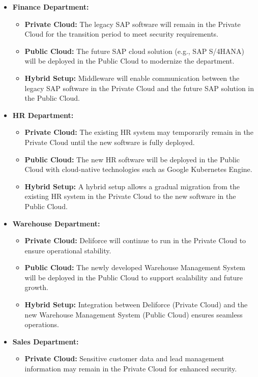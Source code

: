 \begin{itemize}
    \item \textbf{Finance Department:} 
    \begin{itemize}
        \item \textbf{Private Cloud:} The legacy SAP software will remain in the Private Cloud for the transition period to meet security requirements.
        \item \textbf{Public Cloud:} The future SAP cloud solution (e.g., SAP S/4HANA) will be deployed in the Public Cloud to modernize the department.
        \item \textbf{Hybrid Setup:} Middleware will enable communication between the legacy SAP software in the Private Cloud and the future SAP solution in the Public Cloud.
    \end{itemize}
    \item \textbf{HR Department:} 
    \begin{itemize}
        \item \textbf{Private Cloud:} The existing HR system may temporarily remain in the Private Cloud until the new software is fully deployed.
        \item \textbf{Public Cloud:} The new HR software will be deployed in the Public Cloud with cloud-native technologies such as Google Kubernetes Engine.
        \item \textbf{Hybrid Setup:} A hybrid setup allows a gradual migration from the existing HR system in the Private Cloud to the new software in the Public Cloud.
    \end{itemize}
    \item \textbf{Warehouse Department:}
    \begin{itemize}
        \item \textbf{Private Cloud:} Deliforce will continue to run in the Private Cloud to ensure operational stability.
        \item \textbf{Public Cloud:} The newly developed Warehouse Management System will be deployed in the Public Cloud to support scalability and future growth.
        \item \textbf{Hybrid Setup:} Integration between Deliforce (Private Cloud) and the new Warehouse Management System (Public Cloud) ensures seamless operations.
    \end{itemize}
    \item \textbf{Sales Department:}
    \begin{itemize}
        \item \textbf{Private Cloud:} Sensitive customer data and lead management information may remain in the Private Cloud for enhanced security.

\end{itemize}
\end{itemize}
